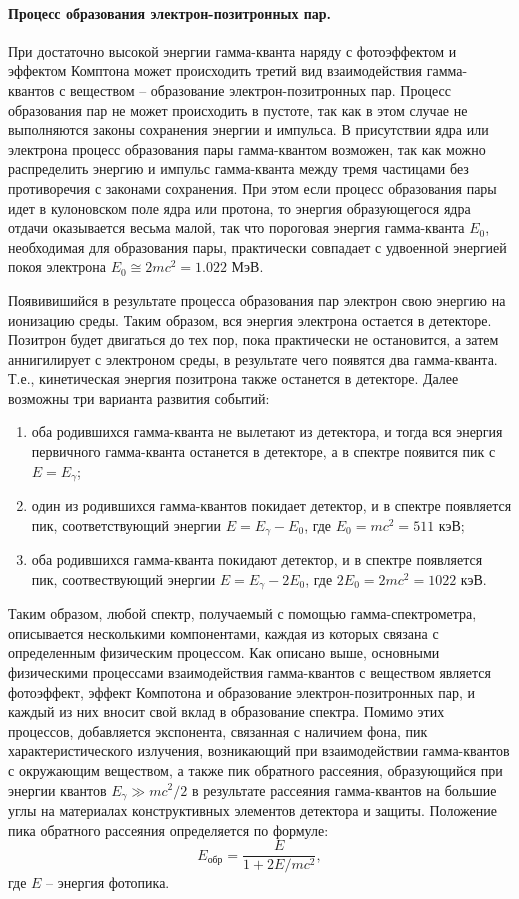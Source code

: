 \documentclass[a4paper, 12pt]{article}
\begin{document}
\paragraph{Процесс образования электрон-позитронных пар.}
При достаточно высокой энергии гамма-кванта наряду с фотоэффектом и эффектом Комптона может происходить третий вид взаимодействия гамма-квантов с веществом -- образование электрон-позитронных пар. Процесс образования пар не может происходить в пустоте, так как в этом случае не выполняются законы сохранения энергии и импульса. В присутствии ядра или электрона процесс образования пары гамма-квантом возможен, так как можно распределить энергию и импульс гамма-кванта между тремя частицами без противоречия с законами сохранения. При этом если процесс образования пары идет в кулоновском поле ядра или протона, то энергия образующегося ядра отдачи оказывается весьма малой, так что пороговая энергия гамма-кванта $E_0$, необходимая для образования пары, практически совпадает с удвоенной энергией покоя электрона $E_0\cong 2mc^2=1.022$ МэВ.\par
Появивишийся в результате процесса образования пар электрон свою энергию на ионизацию среды. Таким образом, вся энергия электрона остается в детекторе. Позитрон будет двигаться до тех пор, пока практически не остановится, а затем аннигилирует с электроном среды, в результате чего появятся два гамма-кванта. Т.е., кинетическая энергия позитрона также останется в детекторе. Далее возможны три варианта развития событий:
\begin{enumerate}
\item оба родившихся гамма-кванта не вылетают из детектора, и тогда вся энергия первичного гамма-кванта останется в детекторе, а в спектре появится пик с $E=E_{\gamma}$;
\item один из родившихся гамма-квантов покидает детектор, и в спектре появляется пик, соответствующий энергии $E=E_{\gamma}-E_0$, где $E_0=mc^2=511$ кэВ;
\item оба родившихся гамма-кванта покидают детектор, и в спектре появляется пик, соотвествующий энергии $E=E_{\gamma}-2E_0$, где $2E_0=2mc^2=1022$ кэВ.
\end{enumerate}
Таким образом, любой спектр, получаемый с помощью гамма-спектрометра, описывается несколькими компонентами, каждая из которых связана с определенным физическим процессом. Как описано выше, основными физическими процессами взаимодействия гамма-квантов с веществом является фотоэффект, эффект Компотона и образование электрон-позитронных пар, и каждый из них вносит свой вклад в образование спектра. Помимо этих процессов, добавляется экспонента, связанная с наличием фона, пик характеристического излучения, возникающий при взаимодействии гамма-квантов с окружающим веществом, а также пик обратного рассеяния, образующийся при энергии квантов $E_{\gamma}\gg mc^2/2$ в результате рассеяния гамма-квантов на большие углы на материалах  конструктивных элементов детектора и защиты. Положение пика обратного рассеяния определяется по формуле:
\begin{equation}
E_{\text{обр}}=\frac{E}{1+2E/mc^2},
\label{eq:Ereverse}
\end{equation}
где $E$ -- энергия фотопика.\par
\end{document}
